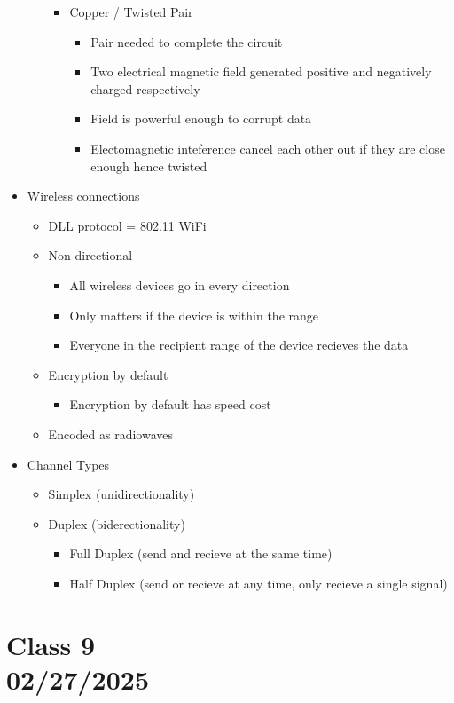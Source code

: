 \documentclass{article}
\begin{document}
\begin{itemize}
\begin{itemize}
        \begin{itemize}
            \item Copper / Twisted Pair
            \begin{itemize}
                \item Pair needed to complete the circuit
                \item Two electrical magnetic field generated positive and negatively charged respectively
                \item Field is powerful enough to corrupt data
                \item Electomagnetic inteference cancel each other out if they are close enough hence twisted 
            \end{itemize}
        \end{itemize}
    \end{itemize}
    \item Wireless connections
    \begin{itemize}
        \item DLL protocol = 802.11 WiFi
        \item Non-directional 
        \begin{itemize}
            \item All wireless devices go in every direction
            \item Only matters if the device is within the range
            \item Everyone in the recipient range of the device recieves the data
        \end{itemize}
        \item Encryption by default
        \begin{itemize}
            \item Encryption by default has speed cost
        \end{itemize}
        \item Encoded as radiowaves
    \end{itemize}
    \item Channel Types
    \begin{itemize}
        \item Simplex (unidirectionality)
        \item Duplex (biderectionality)
        \begin{itemize}
            \item Full Duplex (send and recieve at the same time)
            \item Half Duplex (send or recieve at any time, only recieve a single signal)
        \end{itemize}
    \end{itemize}
\end{itemize}

\section*{Class 9 \\ 02/27/2025}\label{sec:Class 9}
\end{document}
